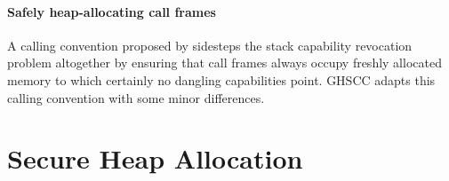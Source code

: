 \documentclass[main.tex]{subfiles}
\begin{document}
\paragraph{Safely heap-allocating call frames} A calling convention proposed by \cite{cerise} sidesteps the stack capability revocation problem altogether by ensuring that call frames always occupy freshly allocated memory to which certainly no dangling capabilities point. GHSCC adapts this calling convention with some minor differences.

\section{Secure Heap Allocation}


\biblio{}
\onlyinsubfile{\glsaddall\printglossaries}
\end{document}
